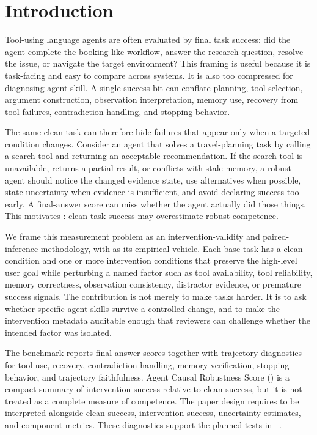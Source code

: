 \section{Introduction}

Tool-using language agents are often evaluated by final task success: did the agent complete the booking-like workflow, answer the research question, resolve the issue, or navigate the target environment? This framing is useful because it is task-facing and easy to compare across systems. It is also too compressed for diagnosing agent skill. A single success bit can conflate planning, tool selection, argument construction, observation interpretation, memory use, recovery from tool failures, contradiction handling, and stopping behavior.

The same clean task can therefore hide failures that appear only when a targeted condition changes. Consider an agent that solves a travel-planning task by calling a search tool and returning an acceptable recommendation. If the search tool is unavailable, returns a partial result, or conflicts with stale memory, a robust agent should notice the changed evidence state, use alternatives when possible, state uncertainty when evidence is insufficient, and avoid declaring success too early. A final-answer score can miss whether the agent actually did those things. This motivates : clean task success may overestimate robust competence.

We frame this measurement problem as an intervention-validity and paired-inference methodology, with \benchmark as its empirical vehicle. Each base task has a clean condition and one or more intervention conditions that preserve the high-level user goal while perturbing a named factor such as tool availability, tool reliability, memory correctness, observation consistency, distractor evidence, or premature success signals. The contribution is not merely to make tasks harder. It is to ask whether specific agent skills survive a controlled change, and to make the intervention metadata auditable enough that reviewers can challenge whether the intended factor was isolated.

The benchmark reports final-answer scores together with trajectory diagnostics for tool use, recovery, contradiction handling, memory verification, stopping behavior, and trajectory faithfulness. Agent Causal Robustness Score (\acrs) is a compact summary of intervention success relative to clean success, but it is not treated as a complete measure of competence. The paper design requires \acrs to be interpreted alongside clean success, intervention success, uncertainty estimates, and component metrics. These diagnostics support the planned tests in --.

